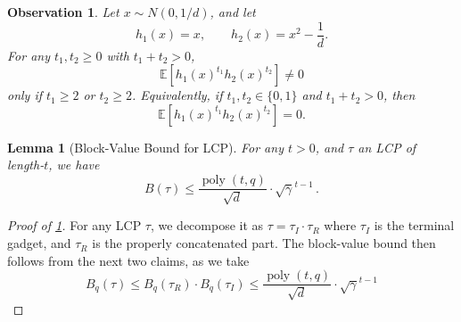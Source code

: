 \documentclass[12pt]{article}
\def \E {\mathbb{E}}
\newtheorem{lemma}[theorem]{Lemma}
\newtheorem{observation}[theorem]{Observation}
\newcommand{\poly}{\operatorname{poly}}
\begin{document}
\begin{observation}
Let \(x\sim N(0,1/d)\), and let
\[
    h_1(x)=x,\qquad h_2(x)=x^2-\frac1d .
\]
For any \(t_1,t_2\ge 0\) with \(t_1+t_2>0\),
\[
    \E\!\left[h_1(x)^{t_1} h_2(x)^{t_2}\right]\neq 0
\]
only if \(t_1\ge 2\) or \(t_2\ge 2\).
Equivalently, if \(t_1,t_2\in\{0,1\}\) and \(t_1+t_2>0\), then
\[
    \E\!\left[h_1(x)^{t_1} h_2(x)^{t_2}\right]=0.
\]
\end{observation}
 
\begin{lemma}[Block-Value Bound for LCP]  \label{lem:LCP-bound}
	For any $t>0$, and $\tau$ an LCP of length-$t$, we have \[ 
	B(\tau) \leq \frac{\poly(t, q) }{\sqrt{d}} \cdot \sqrt{\gamma}^{t-1} \,.
	\]
\end{lemma}

\begin{proof}[Proof of \cref{lem:LCP-bound}]
	For any LCP $\tau$, we decompose it as $\tau = \tau_I \cdot \tau_R$ where $\tau_I$ is the terminal gadget, and $\tau_R$ is the properly concatenated part. The block-value bound then follows from the next two claims, as we take \[
	B_q(\tau)\leq B_q(\tau_R) \cdot B_q(\tau_I) \leq \frac{\poly(t,q)}{\sqrt{d}} \cdot \sqrt{\gamma}^{t-1}
	\]
\end{proof}
\end{document}
